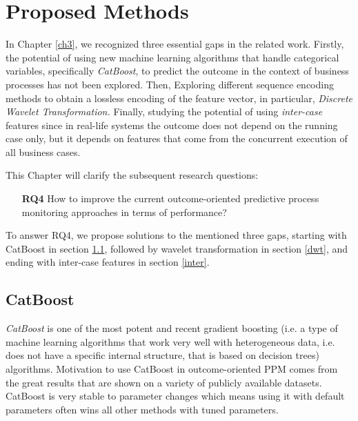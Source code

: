 
\chapter{Proposed Methods} \label{ch4}%

In Chapter \ref{ch3}, we recognized three essential gaps in the related work. Firstly, the potential of using new machine learning algorithms that handle categorical variables, specifically  \textit{CatBoost}, to predict the outcome in the context of business processes has not been explored. Then, Exploring different sequence encoding methods to obtain a lossless encoding of the feature vector, in particular, \textit{Discrete Wavelet Transformation.} Finally, studying the potential of using \textit{inter-case} features since in real-life systems the outcome does not depend on the running case only, but it depends on features that come from the concurrent execution of all business cases. 

This Chapter will clarify the subsequent research questions:


\begin{itemize}[itemindent=0em]
	\item[\textbf{RQ4}] How to improve the current outcome-oriented predictive process monitoring approaches in terms of performance?	
\end{itemize}

To answer RQ4, we propose solutions to the mentioned three gaps, starting with CatBoost in section \ref{catb}, followed by wavelet transformation in section \ref{dwt}, and ending with inter-case features in section \ref{inter}.



\ifpdf
    \graphicspath{{X/figures/PNG/}{X/figures/PDF/}{X/figures/}}
\else
    \graphicspath{{X/figures/EPS/}{X/figures/}}
\fi


\section{CatBoost} \label{catb}
\textit{CatBoost} is one of the most potent and recent gradient boosting (i.e. a type of machine learning algorithms that work very well with heterogeneous data, i.e. does not have a specific internal structure, that is based on decision trees) algorithms. Motivation to use CatBoost in outcome-oriented PPM comes from the great results that are shown on a variety of publicly available datasets. CatBoost is very stable to parameter changes \cite{prokhorenkova2018catboost} which means using it with default parameters often wins all other methods with tuned parameters. 

